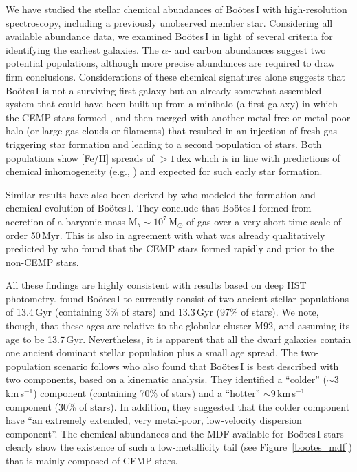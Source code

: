 \documentclass[]{emulateapj}
\begin{document}
We have studied the stellar chemical abundances of Bo\"otes\,I with
high-resolution spectroscopy, including a previously unobserved member
star. Considering all available abundance data, we examined
Bo\"otes\,I in light of several criteria for identifying the earliest galaxies. The
$\alpha$- and carbon abundances suggest two potential populations,
although more precise abundances are required to draw firm
conclusions. Considerations of these chemical signatures alone suggests that
Bo\"otes\,I is not a surviving first galaxy but an already somewhat
assembled system that could have been built up from a minihalo (a
first galaxy) in which the CEMP stars formed \citep{cooke14}, and then
merged with another metal-free or metal-poor halo (or large gas clouds
or filaments) that resulted in an injection of fresh gas
triggering star formation and leading to a second population of
stars. Both populations show [Fe/H] spreads of $>1$\,dex which is in
line with predictions of chemical inhomogeneity (e.g.,
\citealt{frebel12}) and expected for such early star formation.

Similar results have also been derived by \citet{romano15} who modeled
the formation and chemical evolution of Bo\"otes\,I. They conclude
that Bo\"otes\,I formed from accretion of a baryonic mass M$_b \sim
10^{7}$\,M$_{\odot}$ of gas over a very short time scale of order
50\,Myr. This is also in agreement with what was already qualitatively
predicted by \citet{gilmore13} who found that the CEMP stars formed
rapidly and prior to the non-CEMP stars.

All these findings are highly consistent with results based on deep
HST photometry. \citet{brown14b} found Bo\"otes\,I to currently
consist of two ancient stellar populations of 13.4\,Gyr (containing
$3\%$ of stars) and 13.3\,Gyr (97$\%$ of stars). We note,
  though, that these ages are relative to the globular cluster M92,
  and assuming its age to be 13.7\,Gyr. Nevertheless, it is apparent
  that all the dwarf galaxies contain one ancient dominant stellar
  population plus a small age spread.  The two-population scenario
follows \citet{koposov11} who also found that Bo\"otes\,I is best
described with two components, based on a kinematic analysis. They
identified a ``colder'' ($\sim3$\,km\,s$^{-1}$) component (containing 70\% of stars) and a
``hotter'' $\sim9$\,km\,s$^{-1}$ component (30\% of stars).  In addition, they suggested
that the colder component have ``an extremely extended, very
metal-poor, low-velocity dispersion component''. The chemical
abundances and the MDF available for Bo\"otes\,I stars clearly show
the existence of such a low-metallicity tail (see
Figure~\ref{bootes_mdf}) that is mainly composed of CEMP stars.
\end{document}
